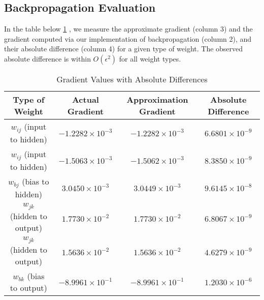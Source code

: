 \subsection{Backpropagation Evaluation}
In the table below \cref{tab:gradient_table} , we measure the approximate gradient (column 3)
and the gradient computed via our implementation of backpropagation (column 2),
and their absolute difference (column 4) for a given type of weight. The
observed absolute difference is within $O( \epsilon^2 )$ for all
weight types.
\begin{table}[H]
	\renewcommand{\arraystretch}{1.25}
	\centering
	\begin{tabular}{|c|c|c|c|}
		\hline
		Type of Weight              & Actual Gradient          & Approximation Gradient   & Absolute Difference     \\
		\hline
		$w_{ij}$ (input to hidden)  & $-1.2282 \times 10^{-3}$ & $-1.2282 \times 10^{-3}$ & $6.6801 \times 10^{-9}$ \\
		$w_{ij}$ (input to hidden)  & $-1.5063 \times 10^{-3}$ & $-1.5062 \times 10^{-3}$ & $8.3850 \times 10^{-9}$ \\
		$w_{bj}$ (bias to hidden)   & $3.0450 \times 10^{-3}$  & $3.0449 \times 10^{-3}$  & $9.6145 \times 10^{-8}$ \\
		$w_{jk}$ (hidden to output) & $1.7730 \times 10^{-2}$  & $1.7730 \times 10^{-2}$  & $6.8067 \times 10^{-9}$ \\
		$w_{jk}$ (hidden to output) & $1.5636 \times 10^{-2}$  & $1.5636 \times 10^{-2}$  & $4.6279 \times 10^{-9}$ \\
		$w_{bk}$ (bias to output)   & $-8.9961 \times 10^{-1}$ & $-8.9961 \times 10^{-1}$ & $1.2030 \times 10^{-6}$ \\
		\hline
	\end{tabular}
	\vspace{0.25cm}
	\caption{Gradient Values with Absolute Differences}
	\label{tab:gradient_table}
\end{table}
